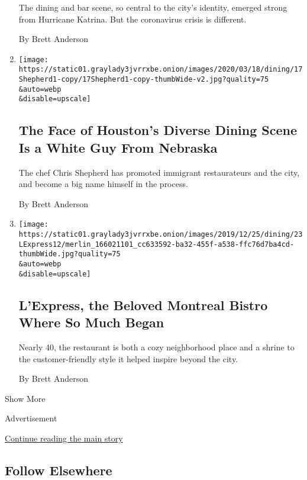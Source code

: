 \begin{enumerate}
  The dining and bar scene, so central to the city's identity, emerged
  strong from Hurricane Katrina. But the coronavirus crisis is
  different.

  By Brett Anderson
\item
  \href{/2020/03/17/dining/chris-shepherd-houston-restaurants.html}{}

  \texttt{[image: https://static01.graylady3jvrrxbe.onion/images/2020/03/18/dining/17Shepherd1-copy/17Shepherd1-copy-thumbWide-v2.jpg?quality=75\\\&auto=webp\\\&disable=upscale]}

  \hypertarget{the-face-of-houstons-diverse-dining-scene-is-a-white-guy-from-nebraska}{%
  \subsection{The Face of Houston's Diverse Dining Scene Is a White Guy
  From
  Nebraska}\label{the-face-of-houstons-diverse-dining-scene-is-a-white-guy-from-nebraska}}

  The chef Chris Shepherd has promoted immigrant restaurateurs and the
  city, and become a big name himself in the process.

  By Brett Anderson
\item
  \href{/2019/12/23/dining/restaurant-lexpress-montreal.html}{}

  \texttt{[image: https://static01.graylady3jvrrxbe.onion/images/2019/12/25/dining/23LExpress12/merlin\_166021101\_cc633592-ba32-455f-a538-ffc76d7ba4cd-thumbWide.jpg?quality=75\\\&auto=webp\\\&disable=upscale]}

  \hypertarget{lexpress-the-beloved-montreal-bistro-where-so-much-began}{%
  \subsection{L'Express, the Beloved Montreal Bistro Where So Much
  Began}\label{lexpress-the-beloved-montreal-bistro-where-so-much-began}}

  Nearly 40, the restaurant is both a cozy neighborhood place and a
  shrine to the customer-friendly style it helped inspire beyond the
  city.

  By Brett Anderson
\end{enumerate}

Show More

Advertisement

\protect\hyperlink{after-mid2}{Continue reading the main story}

\hypertarget{follow-elsewhere}{%
\subsection{Follow Elsewhere}\label{follow-elsewhere}}

